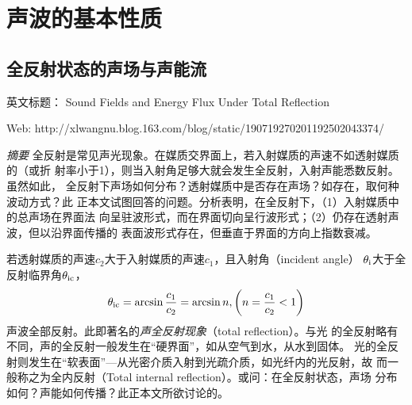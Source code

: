 \documentclass[UTF8]{ctexbook}
\begin{document}
\chapter{声波的基本性质}

\section{全反射状态的声场与声能流}
英文标题：
Sound Fields and Energy Flux Under Total Reflection

Web:
http://xlwangnu.blog.163.com/blog/static/190719270201192502043374/

\emph{摘要}
全反射是常见声光现象。在媒质交界面上，若入射媒质的声速不如透射媒质的（或折
射率小于1），则当入射角足够大就会发生全反射，入射声能悉数反射。虽然如此，
全反射下声场如何分布？透射媒质中是否存在声场？如存在，取何种波动方式？此
正本文试图回答的问题。分析表明，在全反射下，（1）入射媒质中的总声场在界面法
向呈驻波形式，而在界面切向呈行波形式；（2）仍存在透射声波，但以沿界面传播的
表面波形式存在，但垂直于界面的方向上指数衰减。

若透射媒质的声速$c_2$大于入射媒质的声速$c_1$，且入射角（incident angle）
$\theta_\text{i}$大于全反射临界角$\theta_\text{ic}$，
\begin{equation}
\theta_\text{ic} = \arcsin \frac{c_1}{c_2} = \arcsin n, \qty(n=\frac{c_1}{c_2}
<1)
\end{equation}
声波全部反射。此即著名的\emph{声全反射现象}（total reflection）。与光
的全反射略有不同，声的全反射一般发生在“硬界面”，如从空气到水，从水到固体。
光的全反射则发生在“软表面”---从光密介质入射到光疏介质，如光纤内的光反射，故
而一般称之为全内反射（Total internal reflection）。或问：在全反射状态，声场
分布如何？声能如何传播？此正本文所欲讨论的。
\end{document}

